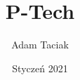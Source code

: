 \documentclass{beamer}
\title{P-Tech}
\author{Adam Taciak}
\institute{Fujitsu}
\date{Styczeń 2021}
\begin{document}
\frame{\titlepage}




\end{document}
